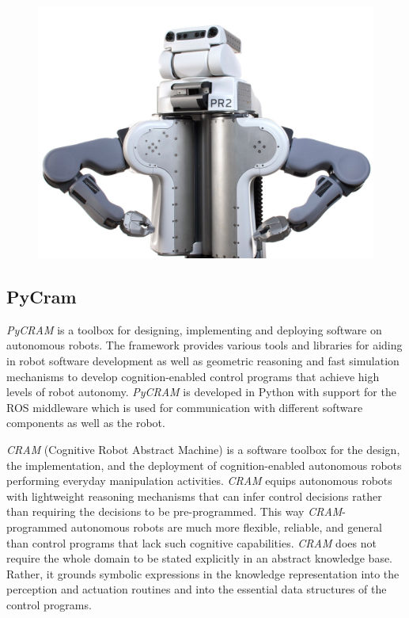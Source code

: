     \begin{figure}[H]
    \includegraphics[scale=0.1]{Graphics/pr2.jpg}
    \end{figure}
    \subsection{PyCram}
	\label{sec:pycram}
	\textit{PyCRAM} is a toolbox for designing, implementing and deploying software on autonomous robots. The framework provides various tools and libraries for aiding in robot software development as well as geometric reasoning and fast simulation mechanisms to develop cognition-enabled control programs that achieve high levels of robot autonomy.
    \textit{PyCRAM} is developed in Python with support for the ROS middleware which is used for communication with different software components as well as the robot.
    
    \textit{CRAM} (Cognitive Robot Abstract Machine) \cite{beetz10cram} is a software toolbox for the design, the implementation, and the deployment of cognition-enabled autonomous robots performing everyday manipulation activities.
	\textit{CRAM} equips autonomous robots with lightweight reasoning mechanisms that can infer control decisions rather than requiring the decisions to be pre-programmed. 
	This way \textit{CRAM}-programmed autonomous robots are much more flexible, reliable, and general than control programs that lack such cognitive capabilities. 
	\textit{CRAM} does not require the whole domain to be stated explicitly in an abstract knowledge base. Rather, it grounds symbolic expressions in the knowledge representation into the perception and actuation routines and into the essential data structures of the control programs. 

